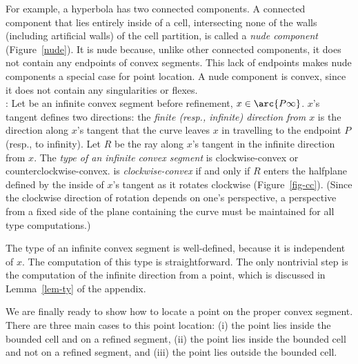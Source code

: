 \vspace{.1in}

\noindent For example, a hyperbola has two connected components.
A connected component that
lies entirely inside of a cell, intersecting none of the walls (including
artificial walls) of the cell partition, is called a {\em nude component} 
(Figure~\ref{nude}).
It is nude because, unlike other connected 
components, it does not contain any endpoints of convex segments.
This lack of endpoints makes nude components a special case for point location.
A nude component is convex, since it does not contain any singularities or flexes.
\\[3pt]
%
%
:
Let  be an infinite convex segment before refinement, $x \in \arc{P\infty}$.
$x$'s tangent defines two directions:
the {\em finite (resp., infinite) direction from $x$}
is the direction along $x$'s tangent that the curve leaves $x$ in travelling
to the endpoint $P$ (resp., to infinity).
Let $R$ be the ray along $x$'s tangent in the infinite direction from $x$.
%
The {\em type of an infinite convex segment} is 
clockwise-convex or counterclockwise-convex.
 is {\em clockwise-convex} if and only if 
$R$ enters the halfplane defined by the inside of $x$'s tangent as it rotates 
clockwise (Figure~\ref{fig-cc}).
(Since the clockwise direction of rotation depends on one's perspective,
a perspective from a fixed side of the plane containing the curve must be maintained for 
all type computations.)

The type of an infinite convex segment is well-defined, because it is independent of $x$.
The computation of this type is straightforward.
The only nontrivial step is the computation of the infinite direction from a point,
which is discussed in Lemma~\ref{lem-ty} of the appendix.



\vspace{.2in}

We are finally ready to show how to locate a point on the proper convex segment.
There are three main cases to this point location:
(i) the point lies inside the bounded cell and on a refined segment,
(ii) the point lies inside the bounded cell and not on a refined segment, and 
(iii) the point lies outside the bounded cell.


